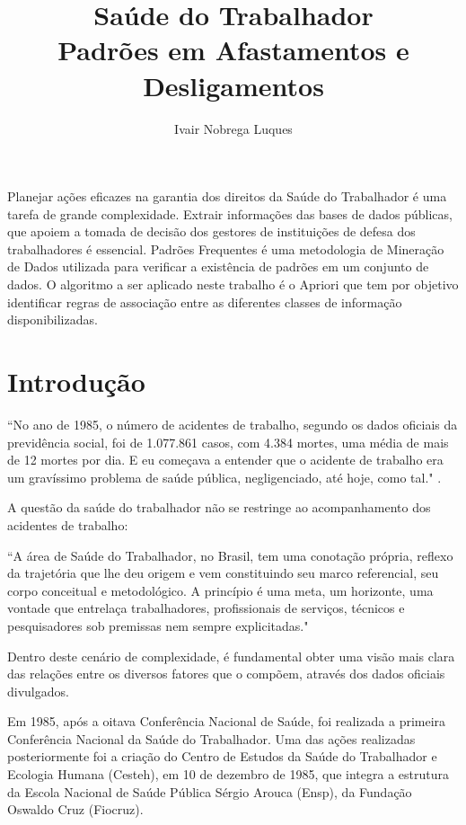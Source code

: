 \documentclass[12pt]{article}
\title{Saúde do Trabalhador\\Padrões em Afastamentos e Desligamentos}
\author{Ivair Nobrega Luques\inst 1}
\begin{document}
 

\maketitle

     
\begin{resumo} 
  Planejar ações eficazes na garantia dos direitos da Saúde do Trabalhador é uma tarefa de grande complexidade. 
  Extrair informações das bases de dados públicas, que apoiem a tomada de decisão dos gestores de instituições de defesa dos trabalhadores é essencial.
  Padrões Frequentes é uma metodologia de Mineração de Dados utilizada para verificar a existência de padrões em um conjunto de dados. O algoritmo a ser aplicado neste trabalho é o Apriori que tem por objetivo identificar regras de associação entre as diferentes classes de informação disponibilizadas.
  \end{resumo}


\section{Introdução}

``No ano de 1985, o número de acidentes de trabalho, segundo os dados oficiais da previdência social, foi de 1.077.861 casos, com 4.384 mortes, uma média de mais de 12 mortes por dia. E eu começava a entender que o acidente de trabalho era um gravíssimo problema de saúde pública, negligenciado, até hoje, como tal." \cite{Vasconcellos2007}.

A questão da saúde do trabalhador não se restringe ao acompanhamento dos acidentes de trabalho:

``A área de Saúde do Trabalhador, no Brasil, tem uma conotação própria, reflexo da trajetória que lhe deu origem e vem constituindo seu marco referencial, seu corpo conceitual e metodológico. A princípio é uma meta, um horizonte, uma vontade que entrelaça trabalhadores, profissionais de serviços, técnicos e pesquisadores sob premissas nem sempre explicitadas."\cite{minayo1997construccao}

Dentro deste cenário de complexidade, é fundamental obter uma visão mais clara das relações entre os diversos fatores que o compõem, através dos dados oficiais divulgados.

Em 1985, após a oitava Conferência Nacional de Saúde, foi realizada a primeira Conferência Nacional da Saúde do Trabalhador. Uma das ações realizadas posteriormente foi a criação do Centro de Estudos da Saúde do Trabalhador e Ecologia Humana (Cesteh), em 10 de dezembro de 1985, que  integra a estrutura da Escola Nacional de Saúde Pública Sérgio Arouca (Ensp), da Fundação Oswaldo Cruz (Fiocruz).
\end{document}
